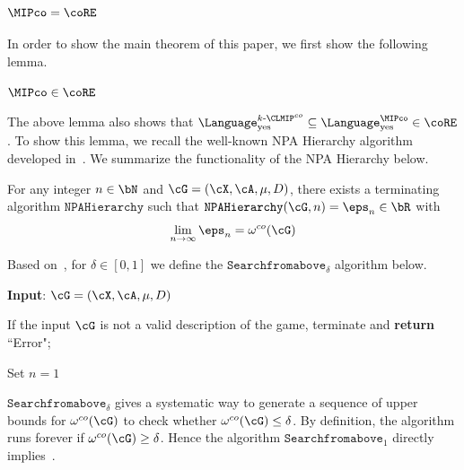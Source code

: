 \subsubsection{$\MIPco=\coRE$} \label{sec:MIPcocoREproof}

In order to show the main theorem of this paper, we first show the following lemma. 
\begin{lemma} \label{lem:MIPcoincoRE}
	$\MIPco \in \coRE$
\end{lemma}
The above lemma also shows that $\Language^{k\text{-}\CLMIP^{co}}_{\text{yes}} \subseteq \Language^{\MIPco}_{\text{yes}} \in \coRE$. To show this lemma, we recall the well-known NPA Hierarchy algorithm developed in~\cite{navascuesConvergentHierarchySemidefinite2008b}. We summarize the functionality of the NPA Hierarchy below. 
\begin{theorem} \label{thm:NPA}
	For any integer $n \in \bN$ and $\cG = (\cX, \cA, \mu, D)$, there exists a terminating algorithm $\texttt{NPAHierarchy}$ such that $\texttt{NPAHierarchy}(\cG, n) = \eps_n \in \bR$ with 
	\begin{equation*}
		\lim_{n \rightarrow\infty} \eps_n = \omega^{co}(\cG)
	\end{equation*}
\end{theorem}
Based on~, for $\delta \in [0,1]$ we define the $\texttt{Searchfromabove}_{\delta}$ algorithm below. 

\vspace{10pt}
\IncMargin{1em}
\begin{algorithm}[H]
	\DontPrintSemicolon
	
	\textbf{Input}: $\cG = (\cX, \cA, \mu, D)$
	
	If the input $\cG$ is not a valid description of the game, terminate and \textbf{return} ``Error"; 
	
	Set $n = 1$
	
	\caption{The description for \gls{Searchfromabove}.}
	\label{pseu:searchfromabove}
\end{algorithm}\DecMargin{1em}
\vspace{10pt} 
$\texttt{Searchfromabove}_{\delta}$ gives a systematic way to generate a sequence of upper bounds for $\omega^{co}(\cG)$ to check whether $\omega^{co}(\cG) \leq \delta$. By definition, the algorithm runs forever if $\omega^{co}(\cG) \geq \delta$. Hence the algorithm $\texttt{Searchfromabove}_{1}$ directly implies~.

